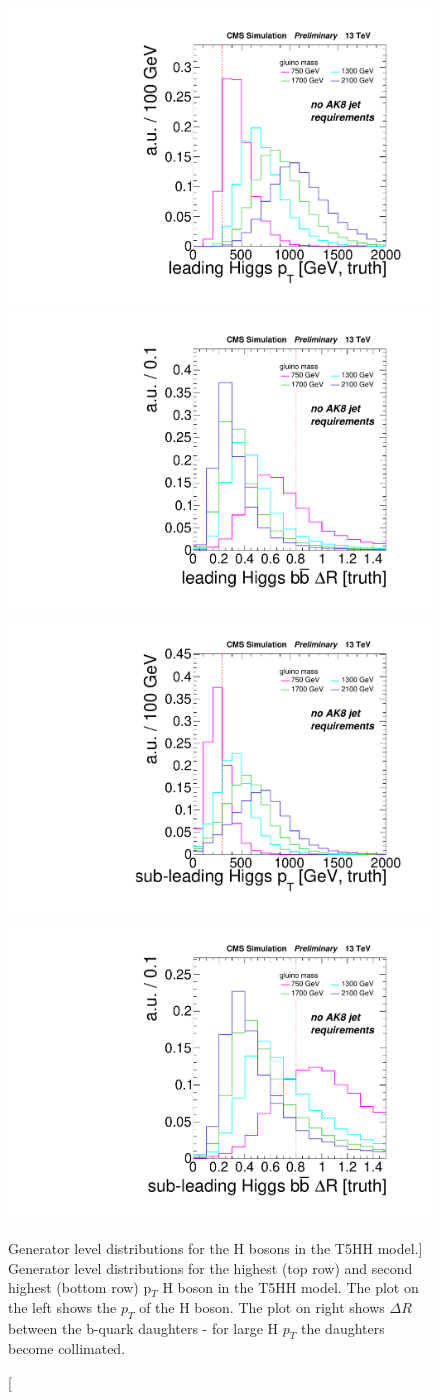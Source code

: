 \begin{figure}[hbp!]
\centering
\includegraphics[width=0.45\linewidth]{figs/leadHiggsPt.pdf}
\includegraphics[width=0.45\linewidth]{figs/leadHiggsDr.pdf}\\
\includegraphics[width=0.45\linewidth]{figs/subleadHiggsPt.pdf}
\includegraphics[width=0.45\linewidth]{figs/subleadHiggsDr.pdf}\\
\caption
[Generator level distributions for the H bosons in the T5HH model.]
{Generator level distributions for the highest (top row) and second highest (bottom row) p$_{T}$ H boson in the T5HH model. The plot on the left shows the $p_{T}$ of the H boson. The plot on right shows $\Delta R$ between the b-quark daughters - for large H $p_{T}$ the daughters become collimated.}
\label{fig:GenHiggsBoost}
\end{figure}

